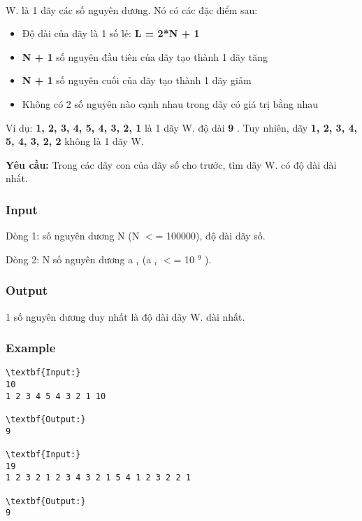 

 

W. là 1 dãy các số nguyên dương. Nó có các đặc điểm sau:
\begin{itemize}
	\item Độ dài của dãy là 1 số lẻ: \textbf{ L = 2*N + 1 }
	\item \textbf{N + 1 } số nguyên đầu tiên của dãy tạo thành 1 dãy tăng
	\item \textbf{N + 1 } số nguyên cuối của dãy tạo thành 1 dãy giảm
	\item Không có 2 số nguyên nào cạnh nhau trong dãy có giá trị bằng nhau
\end{itemize}

Ví dụ: \textbf{ 1, 2, 3, 4, 5, 4, 3, 2, 1 } là 1 dãy W. độ dài \textbf{ 9 } . Tuy nhiên, dãy \textbf{ 1, 2, 3, 4, 5, 4, 3, 2, 2 } không là 1 dãy W.

\textbf{Yêu cầu: } Trong các dãy con của dãy số cho trước, tìm dãy W. có độ dài dài nhất.

\subsubsection{Input}

Dòng 1: số nguyên dương N (N $<$= 100000), độ dài dãy số.

Dòng 2: N số nguyên dương a $_ i $ (a $_ i $ $<$= 10 $^ 9 $ ).

\subsubsection{Output}

1 số nguyên dương duy nhất là độ dài dãy W. dài nhất.

\subsubsection{Example}
\begin{verbatim}
\textbf{Input:}
10
1 2 3 4 5 4 3 2 1 10

\textbf{Output:}
9

\textbf{Input:}
19
1 2 3 2 1 2 3 4 3 2 1 5 4 1 2 3 2 2 1

\textbf{Output:}
9\end{verbatim}